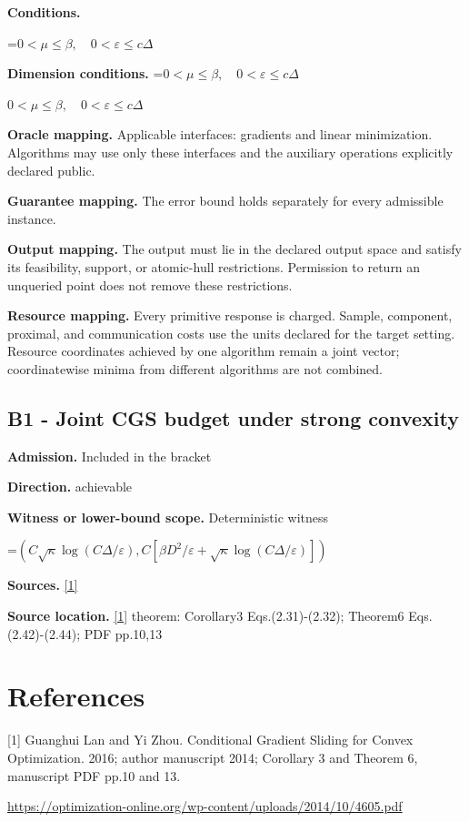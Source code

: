 \documentclass[10pt,a4paper]{article}
\newcommand{\AtlasMath}[1]{\par\begingroup\centering\setbox0=\hbox{$\displaystyle #1$}\ifdim\wd0>1.4\linewidth\typeout{ATLAS WIDE FORMULA: \the\wd0}\fi\ifdim\wd0>\linewidth\resizebox{\linewidth}{!}{\box0}\else\box0\fi\par\endgroup}
\newcommand{\AtlasInlineMath}[1]{\begingroup\setbox0=\hbox{$#1$}\ifdim\wd0>.4\linewidth\endgroup\AtlasMath{#1}\else\endgroup$#1$\fi}
\begin{document}
\textbf{Conditions.} 
\AtlasMath{0<\mu\le\beta,\quad0<\varepsilon\le c\Delta}


\textbf{Dimension conditions.} \AtlasInlineMath{0<\mu\le\beta,\quad0<\varepsilon\le c\Delta}

\textbf{Oracle mapping.} Applicable interfaces: gradients and linear minimization. Algorithms may use only these interfaces and the auxiliary operations explicitly declared public.

\textbf{Guarantee mapping.} The error bound holds separately for every admissible instance.

\textbf{Output mapping.} The output must lie in the declared output space and satisfy its feasibility, support, or atomic-hull restrictions. Permission to return an unqueried point does not remove these restrictions.

\textbf{Resource mapping.} Every primitive response is charged. Sample, component, proximal, and communication costs use the units declared for the target setting. Resource coordinates achieved by one algorithm remain a joint vector; coordinatewise minima from different algorithms are not combined.

\subsection{B1 - Joint CGS budget under strong convexity}
\textbf{Admission.} Included in the bracket

\textbf{Direction.} achievable

\textbf{Witness or lower-bound scope.} Deterministic witness

\AtlasMath{(C\sqrt\kappa\log(C\Delta/\varepsilon),C[\beta D^2/\varepsilon+\sqrt\kappa\log(C\Delta/\varepsilon)])}
\textbf{Sources.} \href{https://optimization-online.org/wp-content/uploads/2014/10/4605.pdf}{[1]}

\textbf{Source location.} \href{https://optimization-online.org/wp-content/uploads/2014/10/4605.pdf}{[1]} theorem: Corollary3 Eqs.(2.31)-(2.32); Theorem6 Eqs.(2.42)-(2.44); PDF pp.10,13

\section{References}
[1] Guanghui Lan and Yi Zhou. Conditional Gradient Sliding for Convex Optimization. 2016; author manuscript 2014; Corollary 3 and Theorem 6, manuscript PDF pp.10 and 13.

\url{https://optimization-online.org/wp-content/uploads/2014/10/4605.pdf}
\end{document}

